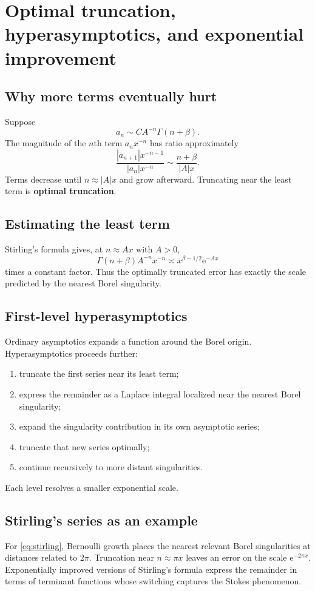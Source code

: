 \documentclass[11pt,openany]{book}
\theoremstyle{plain}
\theoremstyle{definition}
\theoremstyle{remark}
\newcommand{\e}{\mathrm{e}}
\newcommand{\defterm}[1]{\textbf{#1}}
\begin{document}
\chapter{Optimal truncation, hyperasymptotics, and exponential improvement}
\label{chap:hyperasymptotics}

\section{Why more terms eventually hurt}
Suppose
\[
  a_n\sim C A^{-n}\Gamma(n+\beta).
\]
The magnitude of the $n$th term $a_nx^{-n}$ has ratio approximately
\[
  \frac{|a_{n+1}|x^{-n-1}}{|a_n|x^{-n}}
  \sim\frac{n+\beta}{|A|x}.
\]
Terms decrease until $n\approx|A|x$ and grow afterward. Truncating near the least term is \defterm{optimal truncation}.

\section{Estimating the least term}
Stirling's formula gives, at $n\approx Ax$ with $A>0$,
\[
  \Gamma(n+\beta)A^{-n}x^{-n}
  \asymp x^{\beta-1/2}\e^{-Ax}
\]
times a constant factor. Thus the optimally truncated error has exactly the scale predicted by the nearest Borel singularity.

\section{First-level hyperasymptotics}
Ordinary asymptotics expands a function around the Borel origin. Hyperasymptotics proceeds further:
\begin{enumerate}
\item truncate the first series near its least term;
\item express the remainder as a Laplace integral localized near the nearest Borel singularity;
\item expand the singularity contribution in its own asymptotic series;
\item truncate that new series optimally;
\item continue recursively to more distant singularities.
\end{enumerate}
Each level resolves a smaller exponential scale.

\section{Stirling's series as an example}
For \cref{eq:stirling}, Bernoulli growth places the nearest relevant Borel singularities at distances related to $2\pi$. Truncation near $n\approx\pi x$ leaves an error on the scale $\e^{-2\pi x}$. Exponentially improved versions of Stirling's formula express the remainder in terms of terminant functions whose switching captures the Stokes phenomenon.
\end{document}
